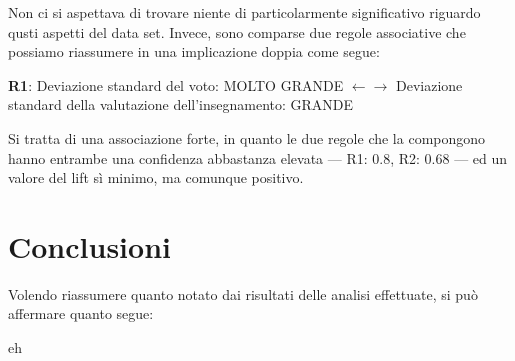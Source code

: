             Non ci si aspettava di trovare niente di particolarmente significativo riguardo qusti aspetti del data set. Invece, sono comparse due regole associative che possiamo riassumere in una implicazione doppia come segue:

            \begin{center}
                \textbf{R1}: Deviazione standard del voto: MOLTO GRANDE $\leftarrow \rightarrow$ Deviazione standard della valutazione dell'insegnamento: GRANDE
            \end{center}

            Si tratta di una associazione forte, in quanto le due regole che la compongono hanno entrambe una confidenza abbastanza elevata --- R1: 0.8, R2: 0.68 --- ed un valore del lift sì minimo, ma comunque positivo. \\

\section{Conclusioni}

    Volendo riassumere quanto notato dai risultati delle analisi effettuate, si può affermare quanto segue:

    eh